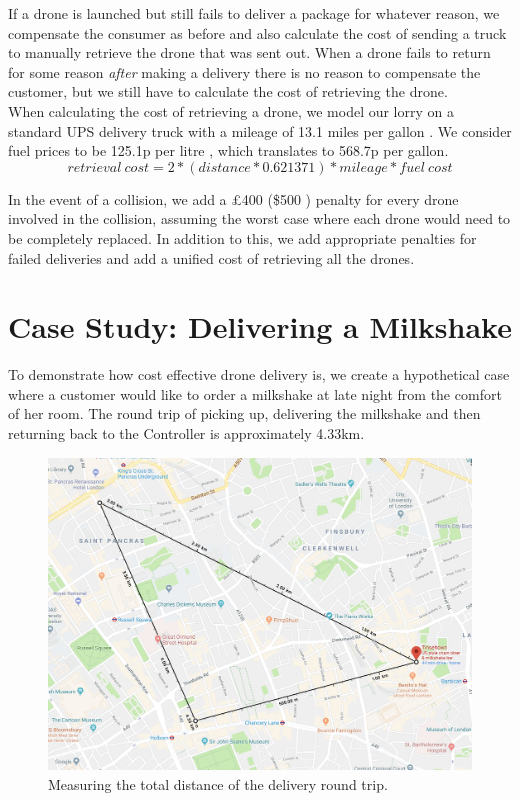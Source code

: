 \documentclass[a4paper,11pt,titlepage]{report}
\begin{document}
If a drone is launched but still fails to deliver a package for whatever reason, we compensate the consumer as before and also calculate the cost of sending a truck to manually retrieve the drone that was sent out. When a drone fails to return for some reason \textit{after} making a delivery there is no reason to compensate the customer, but we still have to calculate the cost of retrieving the drone.\\

When calculating the cost of retrieving a drone, we model our lorry on a standard UPS delivery truck with a mileage of 13.1 miles per gallon \cite{Lammert2009}. We consider fuel prices to be 125.1p per litre \cite{TheAA2018}, which translates to 568.7p per gallon.
$$ retrieval\ cost = 2 * (distance * 0.621371) * mileage * fuel\ cost $$

In the event of a collision, we add a £400 (\$500 \cite{Jung2017}) penalty for every drone involved in the collision, assuming the worst case where each drone would need to be completely replaced. In addition to this, we add appropriate penalties for failed deliveries and add a unified cost of retrieving all the drones.

\section{Case Study: Delivering a Milkshake}
To demonstrate how cost effective drone delivery is, we create a hypothetical case where a customer would like to order a milkshake at late night from the comfort of her room. The round trip of picking up, delivering the milkshake and then returning back to the Controller is approximately 4.33km.

\begin{figure}[!hbpt]
  \center
  \includegraphics[width=0.9\linewidth]{img/drone_delivery_example_cost.png}
  \caption{Measuring the total distance of the delivery round trip.}
  \label{fig:drone_delivery_example_cost}
\end{figure}
\end{document}
